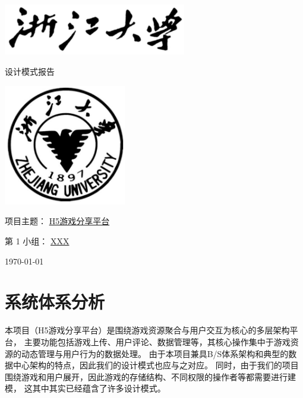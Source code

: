 \documentclass[12pt]{ctexart} %
\begin{document}
\begin{titlepage}
  \centering %
  \includegraphics[width=0.6\textwidth]{zjutitle.jpg} %
  
  \vspace{2cm} %
  
  {\fontsize{36}{48}\selectfont{} 设计模式报告} %
  
  \vspace{2cm} %
  
  \includegraphics[width=0.4\textwidth]{zjulogo.jpg} %
  
  \vspace{2cm}
  
  {\Huge{} 项目主题： \underline{H5游戏分享平台}} %
  
  \vspace{1cm}

  {\Large{} 第 1 小组： \underline{XXX}} %
  
  \vspace{1cm} %
  
  {\Large{} \today} %

\end{titlepage}

\newpage
\tableofcontents %
\newpage

\section{系统体系分析} %
本项目（H5游戏分享平台）是围绕游戏资源聚合与用户交互为核心的多层架构平台，
主要功能包括游戏上传、用户评论、数据管理等，其核心操作集中于游戏资源的动态管理与用户行为的数据处理。
由于本项目兼具B/S体系架构和典型的数据中心架构的特点，因此我们的设计模式也应与之对应。
同时，由于我们的项目围绕游戏和用户展开，因此游戏的存储结构、不同权限的操作者等都需要进行建模，
这其中其实已经蕴含了许多设计模式。
\end{document}
